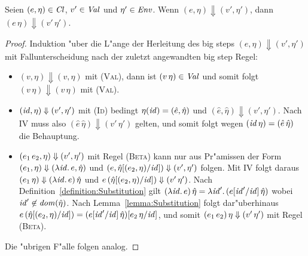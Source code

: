 \documentclass[12pt,fleqn]{article}
\newcommand{\RN}[1]{\mbox{\textsc{(#1)}}}
\newcommand{\Cl}{\name{Cl}}
\begin{document}
\begin{theorem} \label{theorem:Korrektheit}
  Seien $(e,\eta) \in \Cl$, $v'\in{\text{\it Val\/}}$ und $\eta'\in{\text{\it Env\/}}$. Wenn $(e,\eta) \Downarrow (v',\eta')$, dann
  $(e\,\eta) \Downarrow (v'\,\eta')$.
\end{theorem}

\begin{proof}
  Induktion "uber die L"ange der Herleitung des big steps $(e,\eta) \Downarrow (v',\eta')$ mit Fallunterscheidung
  nach der zuletzt angewandten big step Regel:
  \begin{itemize}
    \item $(v,\eta) \Downarrow (v,\eta)$ mit \RN{Val}, dann ist $(v\,\eta) \in {\text{\it Val\/}}$ und somit folgt
          $(v\,\eta) \Downarrow (v\,\eta)$ mit \RN{Val}.

    \item $({\text{\it id\/}},\eta) \Downarrow (v',\eta')$ mit \RN{Id} bedingt $\eta({\text{\it id\/}}) = (\hat{e},\hat{\eta})$ und
          $(\hat{e},\hat{\eta}) \Downarrow (v',\eta')$. Nach IV muss also $(\hat{e}\,\hat{\eta})\Downarrow(v'\,\eta')$
          gelten, und somit folgt wegen $({\text{\it id\/}}\,\eta) = (\hat{e}\,\hat{\eta})$ die Behauptung.

    \item $(e_1\,e_2,\eta) \Downarrow (v',\eta')$ mit Regel \RN{Beta} kann nur aus Pr"amissen der Form
          $(e_1,\eta) \Downarrow (\lambda {\text{\it id\/}}.\,e,\hat{\eta})$ und $(e,\hat{\eta}[(e_2,\eta)/{\text{\it id\/}}])\Downarrow(v',\eta')$
          folgen. Mit IV folgt daraus $(e_1\,\eta) \Downarrow (\lambda {\text{\it id\/}}.\,e)\,\hat{\eta}$ und
          $e\,(\hat{\eta}[(e_2,\eta)/{\text{\it id\/}}])\Downarrow(v'\,\eta')$. Nach Definition~\ref{definition:Substitution}
          gilt $(\lambda {\text{\it id\/}}.\,e)\,\hat{\eta} = \lambda {\text{\it id\/}}'.\,(e[{\text{\it id\/}}'/{\text{\it id\/}}]\,\hat{\eta})$ wobei
          ${\text{\it id\/}}'\not\in{\text{\it dom\/}}(\hat{\eta})$. Nach Lemma~\ref{lemma:Substitution} folgt dar"uberhinaus
          $e\,(\hat{\eta}[(e_2,\eta)/{\text{\it id\/}}]) = (e[{\text{\it id\/}}'/{\text{\it id\/}}]\,\hat{\eta})[e_2\,\eta/{\text{\it id\/}}]$, und somit
          $(e_1\,e_2)\,\eta \Downarrow (v'\,\eta')$ mit Regel \RN{Beta}.

  \end{itemize}
  Die "ubrigen F"alle folgen analog.
\end{proof}
\end{document}
